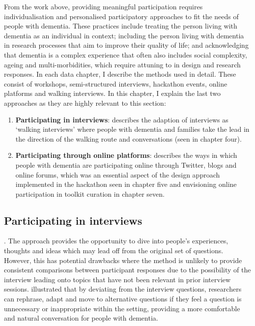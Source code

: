From the work above, providing meaningful participation requires individualisation and personalised participatory approaches to fit the needs of people with dementia.  These practices include treating the person living with dementia as an individual in context; including the person living with dementia in research processes that aim to improve their quality of life; and acknowledging that dementia is a complex experience that often also includes social complexity, ageing and multi-morbidities, which require attuning to in design and research responses. In each data chapter, I describe the methods used in detail. These consist of workshops, semi-structured interviews, hackathon events, online platforms and walking interviews. In this chapter, I explain the last two approaches as they are highly relevant to this section:
\begin{enumerate}

\item \textbf{Participating in interviews}: describes the adaption of interviews as `walking interviews' where people with dementia and families take the lead in the direction of the walking route and conversations (seen in chapter four).

\item \textbf{Participating through online platforms}: describes the ways in which people with dementia are participating online through Twitter, blogs and online forums, which was an essential aspect of the design approach implemented in the hackathon seen in chapter five and envisioning online participation in toolkit curation in chapter seven.
\end{enumerate}

\subsection{Participating in interviews}
\label{PD:Interviews}
 \citep{cheston2000involving}. The approach provides the opportunity to dive into people’s experiences, thoughts and ideas which may lead off from the original set of questions. However, this has potential drawbacks where the method is unlikely to provide consistent comparisons between participant responses due to the possibility of the interview leading onto topics that have not been relevant in prior interview sessions. \cite{samsi2020interviewing} illustrated that by deviating from the interview questions, researchers can rephrase, adapt and move to alternative questions if they feel a question is unnecessary or inappropriate within the setting, providing a more comfortable and natural conversation for people with dementia.

